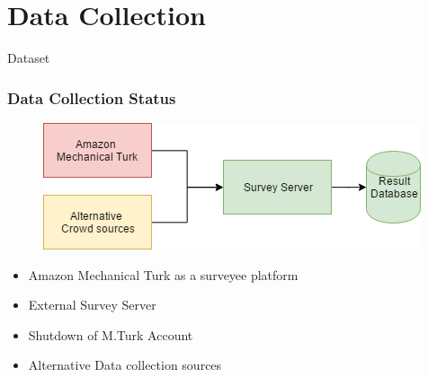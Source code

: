 \section{Data Collection}

\begin{frame}
     \begin{center}
     	\huge Dataset
     \end{center}
\end{frame}

\begin{frame}
\frametitle{Data Collection Status}
\begin{figure}
	\centering
	\includegraphics[scale=.5]{graphics/surveystatus.png}
\end{figure}
\begin{itemize}
	\item Amazon Mechanical Turk as a surveyee platform
	\item External Survey Server
	\item Shutdown of M.Turk Account
	\item Alternative Data collection sources
\end{itemize}
\end{frame}

